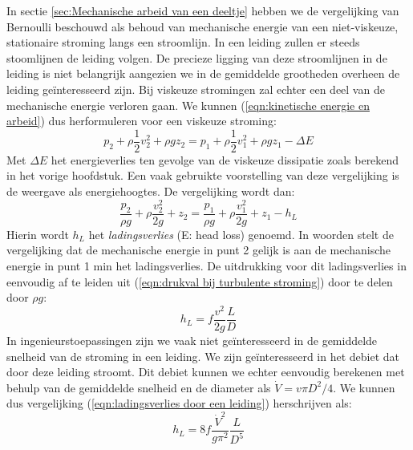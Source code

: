 In sectie \ref{sec:Mechanische arbeid van een deeltje} hebben we de vergelijking van Bernoulli beschouwd als behoud van mechanische energie van een niet-viskeuze, stationaire stroming langs een stroomlijn. In een leiding zullen er steeds stoomlijnen de leiding volgen. De precieze ligging van deze stroomlijnen in de leiding is niet belangrijk aangezien we in de gemiddelde grootheden overheen de leiding geïnteresseerd zijn. Bij viskeuze stromingen zal echter een deel van de mechanische energie verloren gaan. We kunnen (\ref{eqn:kinetische energie en arbeid}) dus herformuleren voor een viskeuze stroming:
\begin{equation}
	p_2 + \rho \frac{1}{2} v_2^2 + \rho g z_2 = p_1 + \rho \frac{1}{2} v_1^2 + \rho g z_1 - \Delta E
\end{equation}
Met $\Delta E$ het energieverlies ten gevolge van de viskeuze dissipatie zoals berekend in het vorige hoofdstuk. Een vaak gebruikte voorstelling van deze vergelijking is de weergave als energiehoogtes. De vergelijking wordt dan:
\begin{equation}
	\frac{p_2}{\rho g} + \rho \frac{v_2^2}{2 g}  + z_2 = \frac{p_1}{\rho g} + \rho \frac{v_1^2}{2 g}  + z_1 - h_L
\end{equation}
Hierin wordt $h_L$ het \emph{ladingsverlies} (E: head loss) genoemd. In woorden stelt de vergelijking dat de mechanische energie in punt 2 gelijk is aan de mechanische energie in punt 1 min het ladingsverlies. De uitdrukking voor dit ladingsverlies in eenvoudig af te leiden uit (\ref{eqn:drukval bij turbulente stroming}) door te delen door $\rho g$:
\begin{equation}
	h_L = f \frac{v^2}{2 g} \frac{L}{D}
	\label{eqn:ladingsverlies door een leiding}
\end{equation}
In ingenieurstoepassingen zijn we vaak niet geïnteresseerd in de gemiddelde snelheid van de stroming in een leiding. We zijn geïnteresseerd in het debiet dat door deze leiding stroomt. Dit debiet kunnen we echter eenvoudig berekenen met behulp van de gemiddelde snelheid en de diameter als $\dot{V} = v \pi D^2/4$. We kunnen dus vergelijking (\ref{eqn:ladingsverlies door een leiding}) herschrijven als:
\begin{equation}
	h_L = 8 f \frac{\dot{V}^2}{g \pi^2} \frac{L}{D^5}
	\label{eqn:ladingsverlies door een leiding debiet}
\end{equation}


